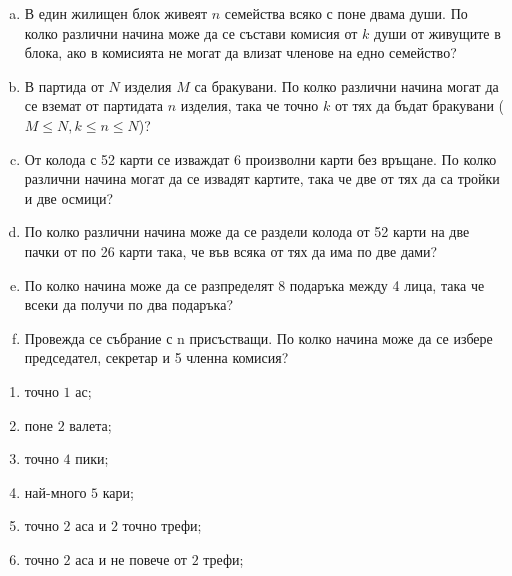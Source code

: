 \begin{problem}
  \begin{enumerate}[a)]
  \item
    В един жилищен блок живеят $n$ семейства всяко с поне двама души.
    По колко различни начина може да се състави комисия от $k$ души от живущите в блока, ако
    в комисията не могат да влизат членове на едно семейство?
  \item
    В партида от $N$ изделия $M$ са бракувани.
    По колко различни начина могат да се вземат от партидата $n$ изделия, така че точно $k$ от тях да бъдат бракувани ($M\leq N, k\leq n\leq N$)?
  \item
    От колода с 52 карти се изваждат 6 произволни карти без връщане.
    По колко различни начина могат да се извадят картите, така че две от тях да са тройки и две осмици?
  \item
    По колко различни начина може да се раздели колода от 52 карти на две пачки от по 26 карти така, че във всяка от тях да има по две дами?
  \item
    По колко начина може да се разпределят 8 подаръка между 4 лица, така че всеки да получи по два подаръка?
  \item
    Провежда се събрание с n присъстващи.
    По колко начина може да се избере председател, секретар и 5 членна комисия?
\end{enumerate}
\end{problem}


\begin{problem}
  \begin{enumerate}
    От колода с $52$ карти се избират $11$. По колко различни начина могат да се изберат извадки, в които се срещат:
  \item
    точно $1$ ас;
  \item
    поне $2$ валета;
  \item
    точно $4$ пики;
  \item
    най-много $5$ кари;
  \item
    точно $2$ аса и $2$ точно трефи;
  \item
    точно $2$ аса и не повече от $2$ трефи;
\end{enumerate}
\end{problem}

